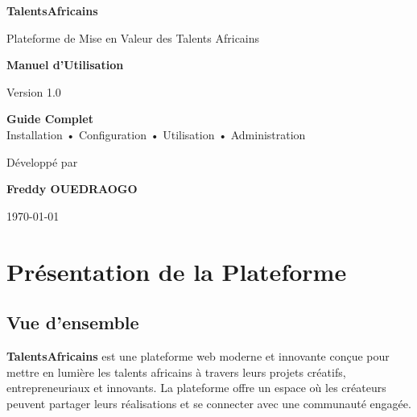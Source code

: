 \documentclass[12pt,a4paper]{article}
\begin{document}
\begin{titlepage}
    \centering
    \vspace*{2cm}
    
    {\Huge\bfseries\color{primarycolor} TalentsAfricains\par}
    \vspace{0.5cm}
    {\Large\color{secondarycolor} Plateforme de Mise en Valeur des Talents Africains\par}
    
    \vspace{2cm}
    
    {\LARGE\bfseries Manuel d'Utilisation\par}
    \vspace{0.5cm}
    {\large Version 1.0\par}
    
    \vspace{3cm}
    
    \begin{tcolorbox}[colback=lightgray, colframe=primarycolor, width=0.8\textwidth, arc=5mm]
        \centering
        \Large\textbf{Guide Complet}\\[0.3cm]
        \normalsize
        Installation • Configuration • Utilisation • Administration
    \end{tcolorbox}
    
    \vfill
    
    {\large Développé par\par}
    {\Large\bfseries\color{primarycolor} Freddy OUEDRAOGO\par}
    \vspace{0.3cm}
    {\normalsize \today\par}
\end{titlepage}

\newpage
\tableofcontents
\newpage

\section{Présentation de la Plateforme}

\subsection{Vue d'ensemble}

\textbf{TalentsAfricains} est une plateforme web moderne et innovante conçue pour mettre en lumière les talents africains à travers leurs projets créatifs, entrepreneuriaux et innovants. La plateforme offre un espace où les créateurs peuvent partager leurs réalisations et se connecter avec une communauté engagée.
\end{document}

